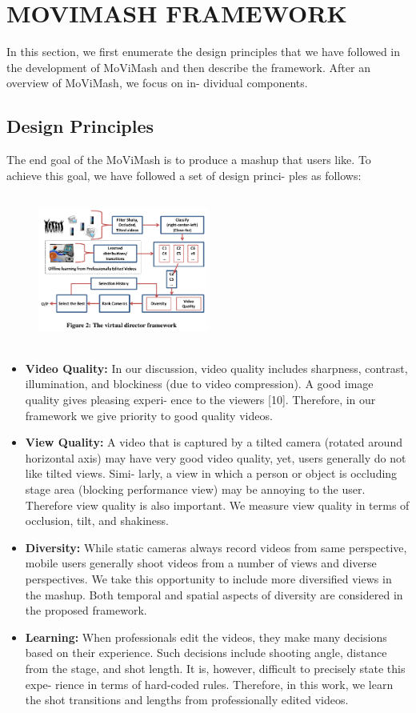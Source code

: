 \documentclass{sig-alternate}
\begin{document}
\section{MOVIMASH FRAMEWORK}
In this section, we first enumerate the design principles that we
have followed in the development of MoViMash and then describe
the framework. After an overview of MoViMash, we focus on in-
dividual components.
\subsection{Design Principles}
The end goal of the MoViMash is to produce a mashup that users
like. To achieve this goal, we have followed a set of design princi-
ples as follows:

\begin{figure}[h]
\includegraphics[width=0.5\textwidth ,height = 5cm]{3}
\end{figure}

\begin{itemize}
    \item \textbf{Video Quality:} In our discussion, video quality includes
sharpness, contrast, illumination, and blockiness (due to video
compression). A good image quality gives pleasing experi-
ence to the viewers [10]. Therefore, in our framework we
give priority to good quality videos.
    \item \textbf{View Quality:} A video that is captured by a tilted camera
(rotated around horizontal axis) may have very good video
quality, yet, users generally do not like tilted views. Simi-
larly, a view in which a person or object is occluding stage
area (blocking performance view) may be annoying to the
user. Therefore view quality is also important. We measure
view quality in terms of occlusion, tilt, and shakiness.
    \item \textbf{Diversity:} While static cameras always record videos from
same perspective, mobile users generally shoot videos from
a number of views and diverse perspectives. We take this
opportunity to include more diversified views in the mashup.
Both temporal and spatial aspects of diversity are considered
in the proposed framework.
    \item \textbf{Learning:} When professionals edit the videos, they make
many decisions based on their experience. Such decisions
include shooting angle, distance from the stage, and shot
length. It is, however, difficult to precisely state this expe-
rience in terms of hard-coded rules. Therefore, in this work,
we learn the shot transitions and lengths from professionally
edited videos.
\end{itemize}
\end{document}
